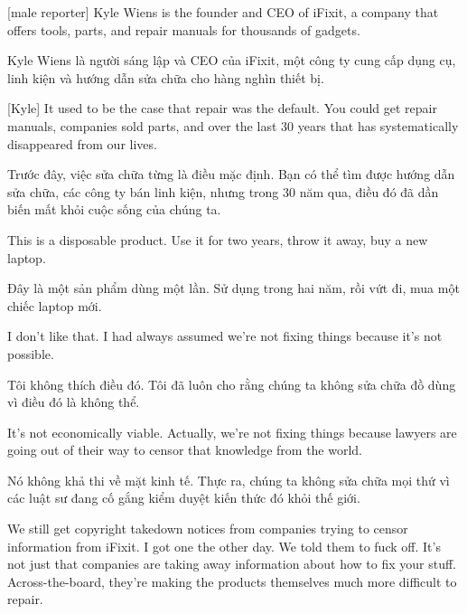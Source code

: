 \documentclass[a4paper]{article}
\begin{document}
	[male reporter] Kyle Wiens is the founder and CEO of iFixit, a company that offers tools, parts, and repair manuals for thousands of gadgets.
	
	\begin{vietnamese-v2}
		 Kyle Wiens là người sáng lập và CEO của iFixit, một công ty cung cấp dụng cụ, linh kiện và hướng dẫn sửa chữa cho hàng nghìn thiết bị.
	\end{vietnamese-v2}
	
	[Kyle] It used to be the case that repair was the default.
	You could get repair manuals, companies sold parts, and over the last 30 years that has systematically disappeared from our lives.
	
	\begin{vietnamese-v2}
		[Kyle] Trước đây, việc sửa chữa từng là điều mặc định. Bạn có thể tìm được hướng dẫn sửa chữa, các công ty bán linh kiện, nhưng trong 30 năm qua, điều đó đã dần biến mất khỏi cuộc sống của chúng ta.
	\end{vietnamese-v2}
	
	This is a disposable product.
	Use it for two years, throw it away, buy a new laptop.
	
	\begin{vietnamese-v2}
		Đây là một sản phẩm dùng một lần.
		Sử dụng trong hai năm, rồi vứt đi, mua một chiếc laptop mới.
	\end{vietnamese-v2}
	
	I don't like that.
	I had always assumed we're not fixing things because it's not possible.
	
	\begin{vietnamese-v2}
		Tôi không thích điều đó. Tôi đã luôn cho rằng chúng ta không sửa chữa đồ dùng vì điều đó là không thể.
	\end{vietnamese-v2}
	
	It's not economically viable.
	Actually, we're not fixing things because lawyers are going out of their way to censor that knowledge from the world.
	
	\begin{vietnamese-v2}
		Nó không khả thi về mặt kinh tế.
		Thực ra, chúng ta không sửa chữa mọi thứ vì các luật sư đang cố gắng kiểm duyệt kiến thức đó khỏi thế giới.
	\end{vietnamese-v2}
	
	We still get copyright takedown notices from companies trying to censor information from iFixit.
	I got one the other day.
	We told them to fuck off.
	It's not just that companies are taking away information about how to fix your stuff.
	Across-the-board, they're making the products themselves much more difficult to repair.
	
\end{document}
